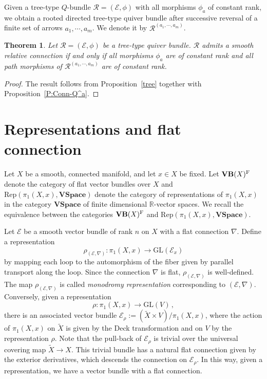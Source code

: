 \documentclass[12pt, reqno]{amsart}
\theoremstyle{plain}
\newtheorem{theorem}{Theorem}[section]
\numberwithin{equation}{section}
\newcommand{\E}{\mathcal{E}}
\begin{document}
Given a tree-type $Q$-bundle $\mathcal{R}=(\mathcal{E},\phi)$ with all morphisms $\phi_a$ of constant rank, we obtain a rooted directed tree-type quiver bundle after successive reversal of a finite set of arrows $a_1,\cdots,a_m$. We denote it by $\mathcal{R}^{(a_1,\cdots,a_m)}$.

\begin{theorem}
Let $\mathcal{R}=(\mathcal{E},\phi)$ be a tree-type quiver bundle. $\mathcal{R}$ admits a smooth relative connection if and only if all morphisms $\phi_a$ are of constant rank and all path morphisms of $\mathcal{R}^{(a_1,\cdots,a_m)}$ are of constant rank.
\end{theorem}
\begin{proof}
The result follows from Proposition~\ref{tree} together with Proposition~\ref{P:Conn-Q^a}.
\end{proof}









\section{Representations and flat connection}

Let $X$ be a smooth, connected manifold, and let $x\in X$ be fixed. Let $\mathbf{VB}(X)^{\rm F}$ denote the category of flat vector bundles over $X$ and $\mathrm{Rep}(\pi_1(X,x), \mathbf{VSpace})$ denote the category of representations of $\pi_1(X,x)$ in the category $\mathbf{VSpace}$ of finite dimensional $\mathbb{R}$-vector spaces.  We recall the equivalence between the categories  $\mathbf{VB}(X)^{\rm F}$ and $\mathrm{Rep}(\pi_1(X,x), \mathbf{VSpace})$.


Let $\E$ be a smooth vector bundle of rank $n$ on $X$ with a flat connection $\nabla$. Define a representation 
$$\rho_{(\E,\nabla)}:\pi_1(X,x)\longrightarrow \mathrm{GL}(\E_x)$$
by mapping each loop to the automorphism of the fiber given by parallel transport along the loop. Since the connection $\nabla$ is flat, $\rho_{(\E,\nabla)}$ is well-defined. The map $\rho_{(\E,\nabla)}$ is called \emph{monodromy representation} corresponding to $(\E,\nabla)$. Conversely, given a representation 
$$\rho:\pi_1(X,x)\longrightarrow \mathrm{GL}(V)\,,$$
there is an associated vector bundle $\E_{\rho}:= (\tilde{X} \times V)/\pi_1(X,x)$, where the action of $\pi_1(X,x)$ on $\tilde{X}$ is given by the Deck transformation and on $V$ by the representation $\rho$. Note that the pull-back of $\E_{\rho}$ is trivial over the universal covering map $\tilde{X}\rightarrow X$. This trivial bundle has a natural flat connection given by the exterior derivatives, which descends the connection on $\E_{\rho}$. In this way, given a representation, we have a vector bundle with a flat connection. 
\end{document}
